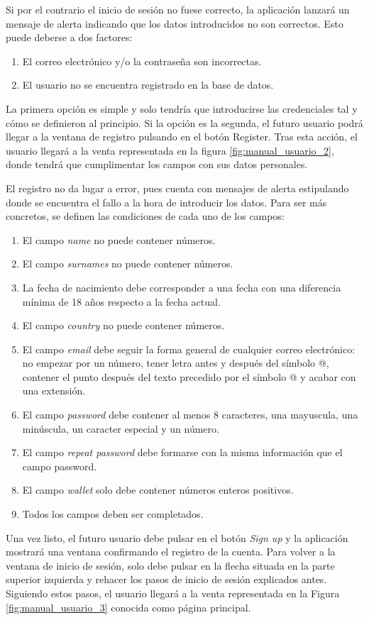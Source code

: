 	
	Si por el contrario el inicio de sesión no fuese correcto, la aplicación lanzará un mensaje de alerta indicando que los datos introducidos no son correctos. Esto puede deberse a dos factores:
	\begin{enumerate}
		\item El correo electrónico y/o la contraseña son incorrectas.
		\item El usuario no se encuentra registrado en la base de datos.
	\end{enumerate}
	
	La primera opción es simple y solo tendría que introducirse las credenciales tal y cómo se definieron al principio. Si la opción es la segunda, el futuro usuario podrá llegar a la ventana de registro pulsando en el botón Register. Tras esta acción, el usuario llegará a la venta representada en la figura \ref{fig:manual_usuario_2}, donde tendrá que cumplimentar los campos con sus datos personales.

	
	El registro no da lugar a error, pues cuenta con mensajes de alerta estipulando donde se encuentra el fallo a la hora de introducir los datos. Para ser más concretos, se definen las condiciones de cada uno de los campos:
	\begin{enumerate}
		\item El campo \emph{name} no puede contener números.
		\item El campo \emph{surnames} no puede contener números.
		\item La fecha de nacimiento debe corresponder a una fecha con una diferencia mínima de 18 años respecto a la fecha actual.
		\item El campo \emph{country} no puede contener números.
		\item El campo \emph{email} debe seguir la forma general de cualquier correo electrónico: no empezar por un número, tener letra antes y después del símbolo @, contener el punto después del texto precedido por el símbolo @ y acabar con una extensión.
		\item El campo \emph{password} debe contener al menos 8 caracteres, una mayuscula, una minúscula, un caracter especial y un número.
		\item El campo \emph{repeat password} debe formarse con la misma información que el campo password.
		\item El campo \emph{wallet} solo debe contener números enteros positivos.
		\item Todos los campos deben ser completados.
	\end{enumerate}
	Una vez listo, el futuro usuario debe pulsar en el botón \emph{Sign up} y la aplicación mostrará una ventana confirmando el registro de la cuenta. Para volver a la ventana de inicio de sesión, solo debe pulsar en la flecha situada en la parte superior izquierda y rehacer los pasos de inicio de sesión explicados antes. Siguiendo estos pasos, el usuario llegará a la venta representada en la Figura \ref{fig:manual_usuario_3} conocida como página principal.

